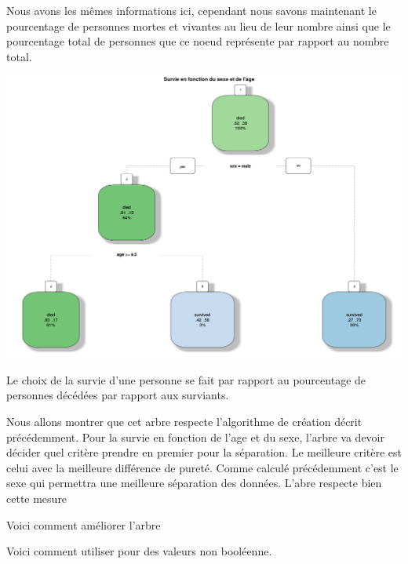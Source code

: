 \documentclass[compress]{beamer}
\begin{document}
\begin{frame}
Nous avons les mêmes informations ici, cependant nous savons maintenant le pourcentage de personnes mortes et vivantes au lieu de leur nombre ainsi que le pourcentage
total de personnes que ce noeud représente par rapport au nombre total.
       \begin{center}
            \includegraphics[width=\textwidth,height=0.8\textheight,keepaspectratio]{survie-sexe-age.png}
        \end{center}
\end{frame}


\begin{frame}
Le choix de la survie d'une personne se fait par rapport au pourcentage de personnes décédées par rapport aux surviants. 

 Nous allons montrer que cet arbre respecte l'algorithme de création décrit précédemment. Pour la survie en fonction de l'age et du sexe, l'arbre va devoir décider quel
 critère prendre en premier pour la séparation. Le meilleure critère est celui avec la meilleure différence de pureté. Comme calculé précédemment c'est
 le sexe qui permettra une meilleure séparation des données. L'abre respecte bien cette mesure

\end{frame}

\begin{frame}
 Voici comment améliorer l'arbre
\end{frame}

\begin{frame}
 Voici comment utiliser pour des valeurs non booléenne.
\end{frame}
\end{document}
